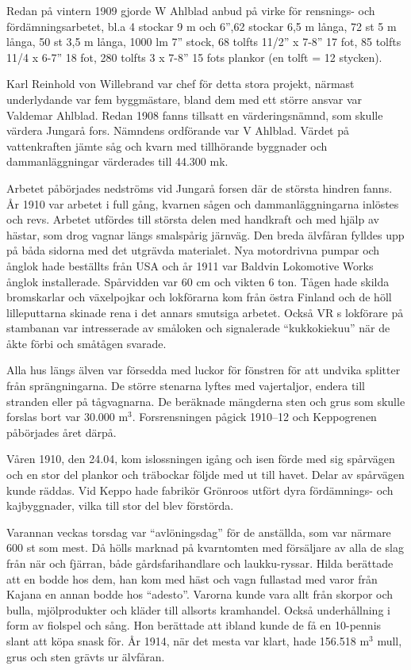 Redan på vintern 1909 gjorde W Ahlblad anbud på virke för rensnings- och 	fördämningsarbetet, bl.a 4 stockar 9 m och 6”,62 stockar 6,5 m långa, 72 st 5 m långa, 50 st 3,5 m långa, 1000 lm 7” stock, 68 tolfts 11/2” x 7-8” 17 fot, 85 tolfts 11/4 x 6-7” 18 fot, 280 tolfts 3 x 7-8” 15 fots plankor (en tolft = 12 stycken).

Karl Reinhold von Willebrand var chef för detta stora projekt, närmast underlydande var fem byggmästare, bland dem med ett större ansvar var Valdemar Ahlblad. Redan 1908 fanns tillsatt en värderingsnämnd, som skulle värdera Jungarå fors. Nämndens ordförande var V Ahlblad. Värdet på vattenkraften jämte såg och kvarn med tillhörande byggnader och dammanläggningar värderades till 44.300 mk.


Arbetet påbörjades nedströms vid Jungarå forsen där de största 	hindren fanns. År 1910 var arbetet i full gång, kvarnen sågen och dammanläggningarna inlöstes och revs. Arbetet utfördes till största delen med handkraft och med hjälp av hästar, som drog vagnar längs smalspårig järnväg. Den breda älvfåran fylldes upp 	på båda sidorna med det utgrävda materialet. Nya motordrivna pumpar och ånglok hade beställts från USA och år 1911 var Baldvin Lokomotive Works ånglok installerade. Spårvidden var 60 cm och vikten 6 ton. Tågen hade skilda bromskarlar och växelpojkar och lokförarna kom från östra Finland och de höll lilleputtarna skinade rena i det annars smutsiga arbetet. Också VR s lokförare på stambanan var intresserade av småloken och 	signalerade ``kukkokiekuu'' när de åkte förbi och småtågen svarade.


Alla hus längs älven var försedda med luckor för fönstren för att undvika splitter från sprängningarna. De större stenarna lyftes med vajertaljor, endera till stranden eller på tågvagnarna. De beräknade mängderna sten och grus som  skulle forslas bort var 30.000 m$^3$. Forsrensningen pågick 1910--12 och Keppogrenen påbörjades året därpå.

Våren 1910, den 24.04, kom islossningen igång och isen förde med sig spårvägen och en stor del plankor och träbockar följde med ut till havet. Delar av spårvägen kunde räddas. Vid Keppo hade fabrikör Grönroos utfört dyra fördämnings- och kajbyggnader, vilka till stor del blev förstörda.

Varannan veckas torsdag var ``avlöningsdag'' för de anställda, som var närmare 600 st som mest. Då hölls marknad på kvarntomten med försäljare av alla de slag från när och fjärran, både gårdsfarihandlare och laukku-ryssar. Hilda berättade att en bodde hos dem, han kom med häst och vagn fullastad med varor från Kajana en annan bodde hos ``adesto''. Varorna kunde vara allt från skorpor och bulla, mjölprodukter och kläder till allsorts kramhandel. Också underhållning i form av fiolspel och sång. Hon berättade att ibland kunde de få en 10-pennis slant att köpa snask för. År 1914, när det mesta var klart, hade 156.518 m$^3$ mull, grus och sten grävts ur älvfåran.


